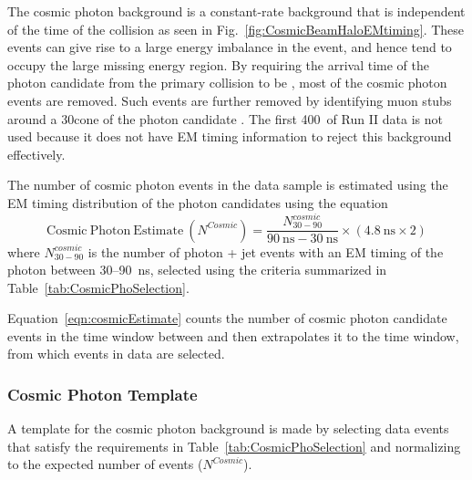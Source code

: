 The cosmic photon background is a constant-rate background that is independent of the time of the collision as seen in Fig.~\ref{fig:CosmicBeamHaloEMtiming}. These events can give rise to a large energy imbalance in the event, and hence tend to occupy the large missing energy region. By requiring the arrival time of the photon candidate from the primary collision to be \intimewindow, most of the cosmic photon events are removed. Such events are further removed by identifying muon stubs around a 30\degree cone of the photon candidate \cite{cdfnote:7960, cdfnote:8409}. The first 400~\pbi of Run II data is not used because it does not have EM timing information to reject this background effectively.

The number of cosmic photon events in the data sample is estimated using the EM timing distribution of the photon candidates using the equation
\begin{equation}
\mathrm{Cosmic~Photon~Estimate}~(N^{Cosmic}) = \frac{N_{30-90}^{cosmic}}{90~\mathrm{ns} - 30~\mathrm{ns}} \times (4.8~\mathrm{ns}\times2)
\label{eqn:cosmicEstimate}
\end{equation}
where $N_{30-90}^{cosmic}$ is the number of photon + jet events with an EM timing of the photon between 30--90~ns, selected using the criteria summarized in Table~\ref{tab:CosmicPhoSelection}.

Equation~\ref{eqn:cosmicEstimate} counts the number of cosmic photon candidate events in the time window between \cosmictimewindow and then extrapolates it to the \intimewindow time window, from which events in data are selected.

\subsubsection{Cosmic Photon Template}
A template for the cosmic photon background is made by selecting data events that satisfy the requirements in Table~\ref{tab:CosmicPhoSelection} and normalizing to the expected number of events ($N^{Cosmic}$).

